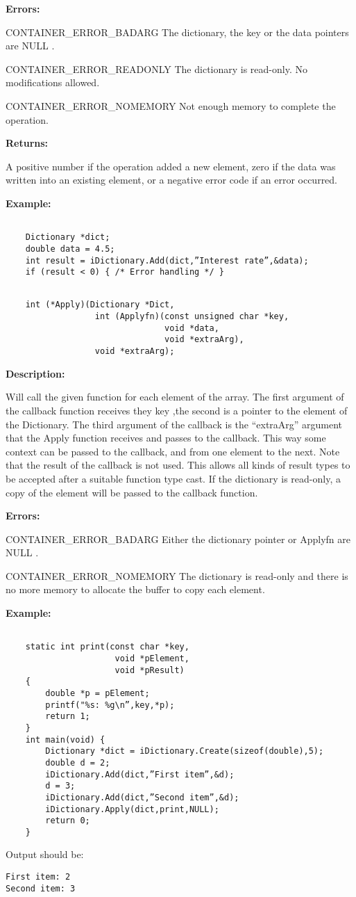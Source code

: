 \documentclass[12pt,a4paper]{memoir} %
\newcommand{\api}[1] {%
\par\vspace{0.4cm}
\addcontentsline{toc}{subsubsection}{#1}\index{#1}
\noindent {\large \textbf{#1}}\index{#1} \hrulefill[1pt][3.5pt]
\nopagebreak
\begin{verbatim}
}
\newcommand{\apidescription}{%
\par \noindent \textbf{Description:} %\par\noindent
}
\newcommand{\apierrors}{%
\par \noindent \textbf{Errors:}\par\noindent
}
\newcommand{\doerror}[1]{%
\par\noindent
{\footnotesize CONTAINER\_ERROR\_#1}
}
\newcommand{\Null}{
{\footnotesize NULL}
}
\newcommand{\returns}{%
\par\noindent \textbf{Returns:} %\par\noindent
}
\newcommand{\example}{
\par\noindent
\textbf{Example:}
\begin{verbatim}
}
\begin{document}
{{\apierrors
\doerror{BADARG} The dictionary, the key or the data pointers are\Null.
\doerror{READONLY} The dictionary is read-only. No modifications allowed.
\doerror{NOMEMORY} Not enough memory to complete the operation.
\returns
A positive number if the operation added a new element, zero if the data was written into an existing element, or a negative error code if an error occurred.
\example
    Dictionary *dict;
    double data = 4.5;
    int result = iDictionary.Add(dict,”Interest rate”,&data);
    if (result < 0) { /* Error handling */ }
\end{verbatim}

\api{Apply}
    int (*Apply)(Dictionary *Dict,
                  int (Applyfn)(const unsigned char *key,
                                void *data,
                                void *extraArg),
                  void *extraArg);
\end{verbatim}
\apidescription
Will call the given function for each element of the array. The first argument of the callback function receives they key ,the second is a pointer to the element of the Dictionary. The  third argument of the callback is the “extraArg” argument that the Apply function receives and passes to  the callback. This way some context can be passed to the callback, and from one element to the next.
Note that the result of the callback is not used. This allows all kinds of result types to be accepted after a suitable function type cast.
If the dictionary is read-only, a copy of the element will be passed to the callback function.

\apierrors
\doerror{BADARG}  Either the dictionary pointer or Applyfn are\Null.
\doerror{NOMEMORY} The dictionary is read-only and there is no more memory to allocate the buffer to copy each element.
\example
    static int print(const char *key,
                      void *pElement,
                      void *pResult)
    {
        double *p = pElement;
        printf("%
        return 1;
    }
    int main(void) {
        Dictionary *dict = iDictionary.Create(sizeof(double),5);
        double d = 2;
        iDictionary.Add(dict,”First item”,&d);
        d = 3;
        iDictionary.Add(dict,”Second item”,&d);
        iDictionary.Apply(dict,print,NULL);
        return 0;
    }
\end{verbatim}

Output should be:
\begin{verbatim}
First item: 2
Second item: 3
\end{verbatim}

}}
\end{document}
